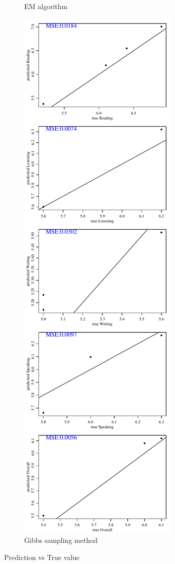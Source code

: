 \documentclass[12pt]{article}
\begin{document}
\begin{figure}[h!]
\begin{subfigure}{0.4\textwidth}
    \caption{EM algorithm}
    \label{fig:0.1-empvt}
\end{subfigure}
\begin{subfigure}{0.4\textwidth}
    \includegraphics[height=.85\textheight]{pic/0.10/Gibbs_PredvsTrue.pdf}
    \caption{Gibbs sampling method}
    \label{fig:0.1-gibbspvt}
\end{subfigure}
        
\caption{Prediction vs True value}
\label{fig:0.1-pvt}
\end{figure}
\end{document}
